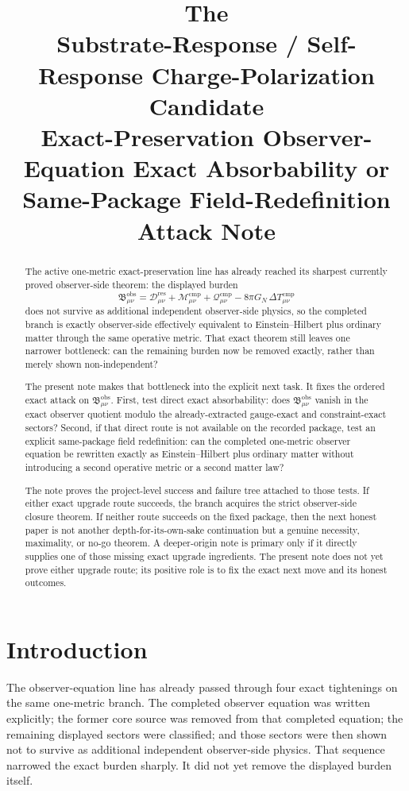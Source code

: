 \documentclass[11pt]{article}
\title{\textbf{The \TheoryName{}}\\[0.4em]
\large Substrate-Response / Self-Response Charge-Polarization Candidate\\
\large Exact-Preservation Observer-Equation Exact Absorbability or Same-Package Field-Redefinition Attack Note}
\author{}
\date{}
\newcommand{\ResidualDec}{\mathcal D_{\mu\nu}^{\mathrm{res}}}
\newcommand{\CompMix}{\mathcal M_{\mu\nu}^{\mathrm{cmp}}}
\newcommand{\CompQuad}{\mathcal Q_{\mu\nu}^{\mathrm{cmp}}}
\newcommand{\DeltaTComp}{\Delta T_{\mu\nu}^{\mathrm{cmp}}}
\newcommand{\ObsBurden}{\mathfrak B_{\mu\nu}^{\mathrm{obs}}}
\begin{document}
\maketitle

\begin{abstract}
The active one-metric exact-preservation line has already reached its sharpest currently proved observer-side theorem: the displayed burden
\[
\ObsBurden
=
\ResidualDec+\CompMix+\CompQuad-8\pi G_N\,\DeltaTComp
\]
does not survive as additional independent observer-side physics, so the completed branch is exactly observer-side effectively equivalent to Einstein--Hilbert plus ordinary matter through the same operative metric. That exact theorem still leaves one narrower bottleneck: can the remaining burden now be removed exactly, rather than merely shown non-independent?

The present note makes that bottleneck into the explicit next task. It fixes the ordered exact attack on \(\ObsBurden\). First, test direct exact absorbability: does \(\ObsBurden\) vanish in the exact observer quotient modulo the already-extracted gauge-exact and constraint-exact sectors? Second, if that direct route is not available on the recorded package, test an explicit same-package field redefinition: can the completed one-metric observer equation be rewritten exactly as Einstein--Hilbert plus ordinary matter without introducing a second operative metric or a second matter law?

The note proves the project-level success and failure tree attached to those tests. If either exact upgrade route succeeds, the branch acquires the strict observer-side closure theorem. If neither route succeeds on the fixed package, then the next honest paper is not another depth-for-its-own-sake continuation but a genuine necessity, maximality, or no-go theorem. A deeper-origin note is primary only if it directly supplies one of those missing exact upgrade ingredients. The present note does not yet prove either upgrade route; its positive role is to fix the exact next move and its honest outcomes.
\end{abstract}

\section{Introduction}

The observer-equation line has already passed through four exact tightenings on the same one-metric branch. The completed observer equation was written explicitly; the former core source was removed from that completed equation; the remaining displayed sectors were classified; and those sectors were then shown not to survive as additional independent observer-side physics. That sequence narrowed the exact burden sharply. It did not yet remove the displayed burden itself.
\end{document}
